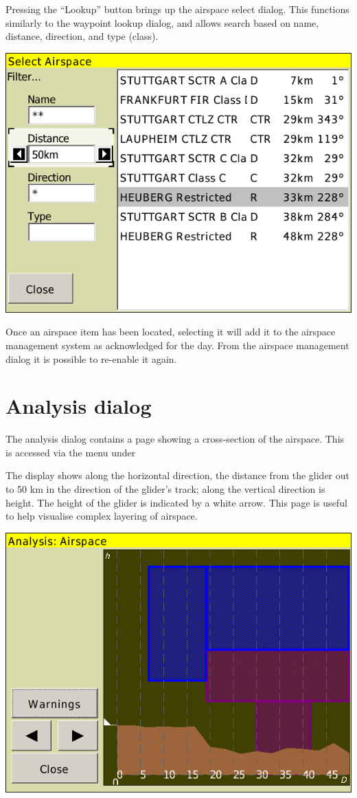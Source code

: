 \documentclass[a4paper,12pt]{refrep}
\begin{document}
Pressing the ``Lookup'' button brings up the airspace select dialog.
This functions similarly to the waypoint lookup dialog, and allows
search based on name, distance, direction, and type (class).  

\begin{center}
\includegraphics[angle=0,width=0.8\linewidth,keepaspectratio='true']{figures/airspacelookup.png}
\end{center}

Once an airspace item has been located, selecting it will add it to
the airspace management system as acknowledged for the day.  From the
airspace management dialog it is possible to re-enable it again.

\section{Analysis dialog}

The analysis dialog contains a page showing a cross-section of the
airspace.  This is accessed via the menu under
\begin{quote}
\blink{}
\end{quote}

The display shows along the horizontal direction, the
distance from the glider out to 50 km in the direction of the glider's
track; along the vertical direction is height.  The height of the
glider is indicated by a white arrow.  This page is useful to help
visualise complex layering of airspace.

\begin{center}
\includegraphics[angle=0,width=0.8\linewidth,keepaspectratio='true']{figures/analysis-airspace.png}
\end{center}
\end{document}
